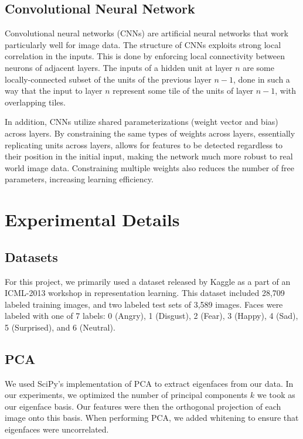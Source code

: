 \documentclass[10pt, twocolumn, twoside]{article}
\begin{document}
\subsection{Convolutional Neural Network}

Convolutional neural networks (CNNs) are artificial neural networks that work particularly
well for image data. The structure of CNNs exploits strong local correlation in the inputs.
This is done by enforcing local connectivity between neurons of adjacent layers.
The inputs of a hidden unit at layer $n$ are some locally-connected subset of
the units of the previous layer $n-1$, done in such a way that the input to layer $n$
represent some tile of the units of layer $n-1$, with overlapping tiles.

In addition, CNNs utilize shared parameterizations (weight vector and bias) across layers.
By constraining the same types of weights across layers, essentially replicating units across
layers, allows for features to be detected regardless to their position in the initial input,
making the network much more robust to real world image data. Constraining multiple weights
also reduces the number of free parameters, increasing learning efficiency.

\section{Experimental Details}

\subsection{Datasets}

For this project, we primarily used a dataset released by Kaggle as a part of an
ICML-2013 workshop in representation learning. This dataset included 28,709 labeled
training images, and two labeled test sets of 3,589 images. Faces were labeled with
one of 7 labels: 0 (Angry), 1 (Disgust), 2 (Fear), 3 (Happy), 4 (Sad), 5 (Surprised),
and 6 (Neutral).

\subsection{PCA}
We used SciPy's implementation of PCA to extract eigenfaces from our data.
In our experiments, we optimized the number of principal components $k$ we took as
our eigenface basis. Our features were then the orthogonal projection of each image
onto this basis. When performing PCA, we added whitening to ensure that eigenfaces
were uncorrelated.
\end{document}
